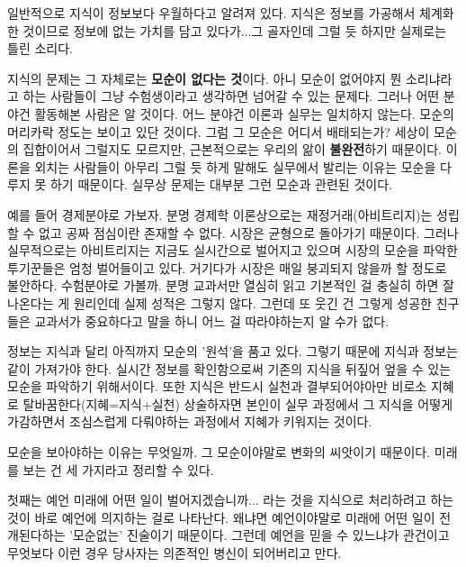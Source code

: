 일반적으로 지식이 정보보다 우월하다고 알려져 있다.
지식은 정보를 가공해서 체계화한 것이므로 정보에 없는 가치를 담고 있다가...그 골자인데
그럴 듯 하지만 실제로는 틀린 소리다.
\vspace{5mm}

지식의 문제는 그 자체로는 \textbf{모순이 없다는 것}이다.
아니 모순이 없어야지 뭔 소리냐라고 하는 사람들이 그냥 수험생이라고 생각하면 넘어갈 수 있는 문제다.
그러나 어떤 분야건 활동해본 사람은 알 것이다. 어느 분야건 이론과 실무는 일치하지 않는다. 모순의 머리카락 정도는 보이고 있단 것이다.
그럼 그 모순은 어디서 배태되는가? 세상이 모순의 집합이어서 그럴지도 모르지만, 근본적으로는 우리의 앎이 \textbf{불완전}하기 때문이다.
이론을 외치는 사람들이 아무리 그럴 듯 하게 말해도 실무에서 발리는 이유는 모순을 다루지 못 하기 때문이다.
실무상 문제는 대부분 그런 모순과 관련된 것이다.
\vspace{5mm}

예를 들어 경제분야로 가보자. 분명 경제학 이론상으로는 재정거래(아비트리지)는 성립할 수 없고
공짜 점심이란 존재할 수 없다. 시장은 균형으로 돌아가기 때문이다.
그러나 실무적으로는 아비트리지는 지금도 실시간으로 벌어지고 있으며 시장의 모순을 파악한 투기꾼들은 엄청 벌어들이고 있다.
거기다가 시장은 매일 붕괴되지 않을까 할 정도로 불안하다.
수험분야로 가볼까. 분명 교과서만 열심히 읽고 기본적인 걸 충실히 하면 잘 나온다는 게 원리인데 실제 성적은 그렇지 않다.
그런데 또 웃긴 건 그렇게 성공한 친구들은 교과서가 중요하다고 말을 하니 어느 걸 따라야하는지 알 수가 없다.
\vspace{5mm}

정보는 지식과 달리 아직까지 모순의 '원석'을 품고 있다.
그렇기 때문에 지식과 정보는 같이 가져가야 한다. 실시간 정보를 확인함으로써 기존의 지식을 뒤짚어 엎을 수 있는 모순을 파악하기 위해서이다.
또한 지식은 반드시 실천과 결부되어야아만 비로소 지혜로 탈바꿈한다(지혜=지식+실천)
상술하자면 본인이 실무 과정에서 그 지식을 어떻게 가감하면서 조심스럽게 다뤄야하는 과정에서 지혜가 키워지는 것이다.
\vspace{5mm}

모순을 보아야하는 이유는 무엇일까. 그 모순이야말로 변화의 씨앗이기 때문이다.
미래를 보는 건 세 가지라고 정리할 수 있다.
\vspace{5mm}

첫째는 예언
미래에 어떤 일이 벌어지겠습니까... 라는 것을 지식으로 처리하려고 하는 것이 바로 예언에 의지하는 걸로 나타난다.
왜냐면 예언이야말로 미래에 어떤 일이 전개된다하는 '모순없는' 진술이기 때문이다.
그런데 예언을 믿을 수 있느냐가 관건이고 무엇보다 이런 경우 당사자는 의존적인 병신이 되어버리고 만다.
\vspace{5mm}

